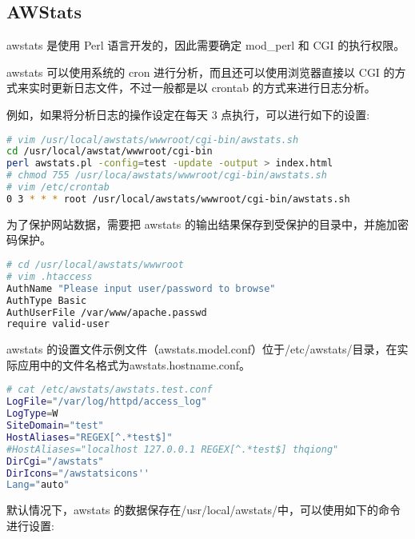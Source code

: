 \subsection{AWStats}

awstats 是使用 Perl 语言开发的，因此需要确定 mod\_perl 和 CGI 的执行权限。

awstats 可以使用系统的 cron 进行分析，而且还可以使用浏览器直接以 CGI 的方式来实时更新日志文件，不过一般都是以 crontab 的方式来进行日志分析。

例如，如果将分析日志的操作设定在每天 3 点执行，可以进行如下的设置:


\begin{lstlisting}[language=bash]
# vim /usr/local/awstats/wwwroot/cgi-bin/awstats.sh
cd /usr/local/awstat/wwwroot/cgi-bin
perl awstats.pl -config=test -update -output > index.html
# chmod 755 /usr/loca/awstats/wwwroot/cgi-bin/awstats.sh
# vim /etc/crontab
0 3 * * * root /usr/local/awstats/wwwroot/cgi-bin/awstats.sh
\end{lstlisting}



为了保护网站数据，需要把 awstats 的输出结果保存到受保护的目录中，并施加密码保护。




\begin{lstlisting}[language=bash]
# cd /usr/local/awstats/wwwroot
# vim .htaccess
AuthName "Please input user/password to browse"
AuthType Basic
AuthUserFile /var/www/apache.passwd
require valid-user
\end{lstlisting}

awstats 的设置文件示例文件（awstats.model.conf）位于/etc/awstats/目录，在实际应用中的文件名格式为awstats.hostname.conf。






\begin{lstlisting}[language=bash]
# cat /etc/awstats/awstats.test.conf
LogFile="/var/log/httpd/access_log"
LogType=W
SiteDomain="test"
HostAliases="REGEX[^.*test$]"
#HostAliases="localhost 127.0.0.1 REGEX[^.*test$] thqiong"
DirCgi="/awstats"
DirIcons="/awstatsicons''
Lang="auto"
\end{lstlisting}


默认情况下，awstats 的数据保存在/usr/local/awstats/中，可以使用如下的命令进行设置:



